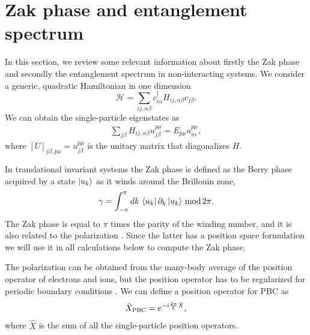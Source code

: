 \documentclass[twocolumn,amsmath,longbibliography,amssymb,superscriptaddress]{revtex4-1}
\begin{document}
\section{Zak phase and entanglement spectrum}
In this section, we review some relevant information about firstly the Zak phase and secondly the entanglement spectrum in non-interacting systems. 
We consider a generic, quadratic Hamiltonian in one dimension
\begin{equation}\label{eq:quadr_Ham}
\mathcal{H} = \sum_{ij,\alpha\beta} c_{i\alpha}^\dagger H_{ij,\alpha \beta}c_{j\beta}.
\end{equation}
We can obtain the single-particle eigenstates as
\begin{align}
\sum_{j\beta}H_{ij,\alpha\beta} u^{p\mu}_{j\beta} = E_{p\mu} u_{i\alpha}^{p\mu},
\end{align}
where $[U]_{j\beta,p\mu} = u^{p\mu}_{j\beta}$ is the unitary matrix that diagonalizes $H$. 

In translational invariant systems the Zak phase is defined as the Berry phase acquired by a state $\ket{u_k}$ as it winds around the Brillouin zone,
\begin{equation}
\gamma = \int_{-\pi}^\pi dk \, \bra{u_k}\partial_k \ket{u_k} \, {\rm mod}\, 2\pi.
\end{equation}
The Zak phase is equal to $\pi$ times the parity of the winding number, and it is also related to the polarization \cite{Resta1997}. Since the latter has a position space formulation we will use  it in all calculations below to compute the Zak phase. 

The polarization can be obtained from the many-body average of the position operator of electrons and ions, but the position operator has to be regularized for periodic boundary conditions \cite{Resta1997}. 
We can define a position operator for PBC as
\begin{equation}
\hat{X}_{\rm PBC} = e^{-i\frac{2\pi}{L}\hat{X}},
\end{equation}
where $\hat{X}$ is the sum of all the single-particle position operators. 
\end{document}
